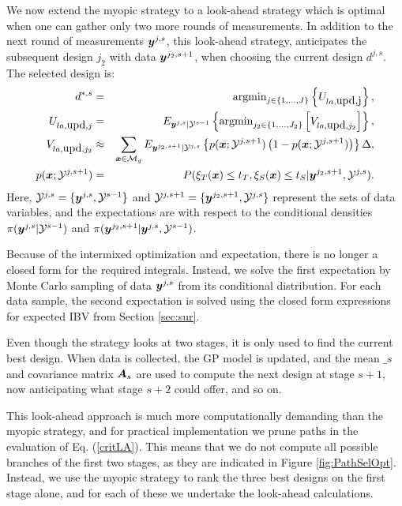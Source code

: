 \documentclass[aoas]{imsart}
\begin{document}
We now extend the myopic strategy to a look-ahead strategy which is
optimal when one can gather only two more rounds of measurements. In
addition to the next round of measurements ${\boldsymbol y}^{j,s}$, this
look-ahead strategy, anticipates the subsequent design $j_2$ with
data ${\boldsymbol y}^{j_2,s+1}$, when choosing the current design $d^{j,s}$.  The
selected design is:
\begin{eqnarray}\label{critLA}
    d^{*,s} &=& \mbox{argmin}_{j \in \{1,\ldots,J\}} \left\{ U_{la,\mbox{upd,j}} \right\},  \\
    U_{la,\mbox{upd},j} & = &  E_{\by^{j,s}|\mathcal{Y}^{s-1}} \left\{ \mbox{argmin}_{j_2 \in \{1,\ldots,{J}_2\}} \left[ V_{la,\mbox{upd},j_2} \right] \right\}, \nonumber \\
V_{la,\mbox{upd},j_2} & \approx & \sum_{\bx \in \mathcal{M}_g} E_{\by^{j_2,s+1}|\mathcal{Y}^{j,s}} \left\{ p(\bx;\mathcal{Y}^{j,s+1})\left( 1-p(\bx;\mathcal{Y}^{j,s+1})\right) \right\} \Delta, \nonumber \\
    p(\bx;\mathcal{Y}^{j,s+1}) &=& P(\xi_T(\bx) \leq t_T, \xi_S(\bx) \leq t_S |\by^{j_2,s+1},\mathcal{Y}^{j,s}). \nonumber
\end{eqnarray}
Here, $\mathcal{Y}^{j,s}=\{{\boldsymbol y}^{j,s},\mathcal{Y}^{s-1}\}$ and
$\mathcal{Y}^{j,s+1}=\{{\boldsymbol y}^{j_2,s+1},\mathcal{Y}^{j,s}\}$ represent
the sets of data variables, and the expectations are with respect to
the conditional densities $\pi({\boldsymbol y}^{j,s}|\mathcal{Y}^{s-1})$ and
$\pi({\boldsymbol y}^{j_2,s+1}|{\boldsymbol y}^{j,s},\mathcal{Y}^{s-1})$.

Because of the intermixed optimization and expectation, there is no
longer a closed form for the required integrals. Instead, we solve the
first expectation by Monte Carlo sampling of data ${\boldsymbol y}^{j,s}$ from its
conditional distribution. For each data sample, the second expectation
is solved using the closed form expressions for expected IBV from
Section \ref{sec:sur}.

Even though the strategy looks at two stages, it is only used to find
the current best design. When data is collected, the GP model is
updated, and the mean $\bm_{s}$ and covariance matrix ${\boldsymbol A}_{s}$ are
used to compute the next design at stage $s+1$, now anticipating what
stage $s+2$ could offer, and so on.

This look-ahead approach is much more computationally demanding than
the myopic strategy, and for practical implementation we prune paths
in the evaluation of Eq. (\ref{critLA}). This means that we do not
compute all possible branches of the first two stages, as they are
indicated in Figure \ref{fig:PathSelOpt}. Instead, we use the myopic
strategy to rank the three best designs on the first stage alone, and
for each of these we undertake the look-ahead calculations.
\end{document}
